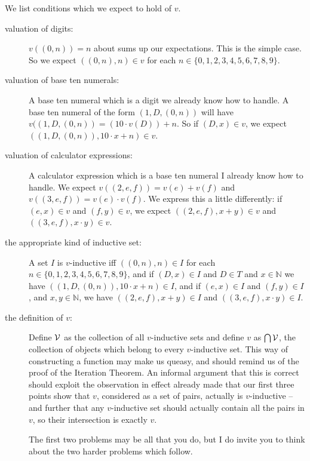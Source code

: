 \documentclass[12pt]{book}
\begin{document}
We list conditions which we expect to hold  of $v$.

\begin{description}

\item[valuation of digits:]  $v((0,n)) = n$ about sums up our expectations.  This is the simple case.  So we expect $((0,n),n) \in v$ for each $n \in \{0,1,2,3,4,5,6,7,8,9\}$.

\item[valuation of base ten numerals:]  A base ten numeral which is a digit we already know how to handle.  A base ten numeral of the form $(1,D,(0,n))$ will
have $v((1,D,(0,n)) = (10\cdot v(D)) + n$.  So if $(D,x) \in v$, we expect $((1,D,(0,n)),10\cdot x+n) \in v$.

\item[valuation of calculator expressions:]  A calculator expression which is a base ten numeral I already know how to handle.  We expect $v((2,e,f)) = v(e)+v(f)$
and $v((3,e,f))=v(e) \cdot v(f)$.  We express this a little differently:  if $(e,x) \in v$ and $(f,y) \in v$, we expect $((2,e,f),x+y)\in v$ and $((3,e,f),x\cdot y) \in v$.

\item[the appropriate kind of inductive set:]  A set $I$ is $v$-inductive iff $((0,n),n) \in I$ for each $n \in \{0,1,2,3,4,5,6,7,8,9\}$, and
 if $(D,x) \in I$ and $D \in T$ and $x \in {\mathbb N}$ we have $((1,D,(0,n)),10\cdot x+n) \in I$, and if $(e,x) \in I$ and $(f,y) \in I$, and $x, y \in {\mathbb N}$, we have $((2,e,f),x+y)\in I$ and $((3,e,f),x\cdot y) \in I$.

\item[the definition of $v$:]  Define ${\cal V}$ as the collection of all $v$-inductive sets and define $v$ as $\bigcap {\cal V}$, the collection of objects which belong to every
$v$-inductive set.  This way of constructing a function may make us queasy, and should remind us of the proof of the Iteration Theorem.  An informal argument that this
is correct should exploit the observation in effect already made that our first three points show that $v$, considered as a set of pairs, actually is $v$-inductive -- and further
that any $v$-inductive set should actually contain all the pairs in $v$, so their intersection is exactly $v$.

\newpage


The first two problems may be all that you do, but I do invite you to think about the two harder problems which follow.


\end{description}
\end{document}

